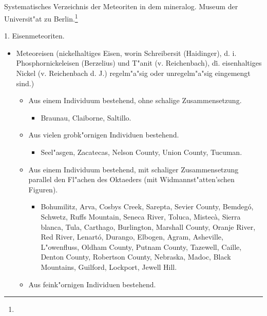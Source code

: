 \documentclass[a4paper, 11pt, oneside]{article}
\begin{document}
\subsection*{}
\begin{center}
Systematisches Verzeichnis der Meteoriten in dem mineralog. Museum der Universit"at zu Berlin.\footnote{}
\end{center}
\begin{center}
1. Eisenmeteoriten.
\end{center}
\begin{itemize}
    \item[1.] Meteoreisen (nickelhaltiges Eisen, worin Schreibersit (Haidinger), d. i. Phosphornickeleisen (Berzelius) und T"anit (v. Reichenbach), d\. i. eisenhaltiges Nickel (v. Reichenbach d. J.) regelm"a"sig oder unregelm"a"sig eingemengt sind.)
    \begin{itemize}
        \item[a.] Aus einem Individuum bestehend, ohne schalige Zusammensetzung.
        \begin{itemize}
            \item Braunau, Claiborne, Saltillo.
        \end{itemize}
        \item[b.] Aus vielen grobk"ornigen Individuen bestehend.
        \begin{itemize}
            \item Seel"asgen, Zacatecas, Nelson County, Union County, Tucuman.
        \end{itemize}
        \item[c.] Aus einem Individuum bestehend, mit schaliger Zusammensetzung parallel den Fl"achen des Oktaeders (mit Widmannst"atten'schen Figuren).
        \begin{itemize}
            \item Bohumilitz, Arva, Cosbys Creek, Sarepta, Sevier County, Bemdegó, Schwetz, Ruffs Mountain, Seneca River, Toluca, Mistecà, Sierra blanca, Tula, Carthago, Burlington, Marshall County, Oranje River, Red River, Lenartó, Durango, Elbogen, Agram, Asheville, L"owenfluss, Oldham County, Putnam County, Tazewell, Caille, Denton County, Robertson County, Nebraska, Madoc, Black Mountains, Guilford, Lockport, Jewell Hill.
        \end{itemize}
        \item[d.] Aus feink"ornigen Individuen bestehend.
        \begin{itemize}

\end{itemize}
\end{itemize}
\end{itemize}
\end{document}
